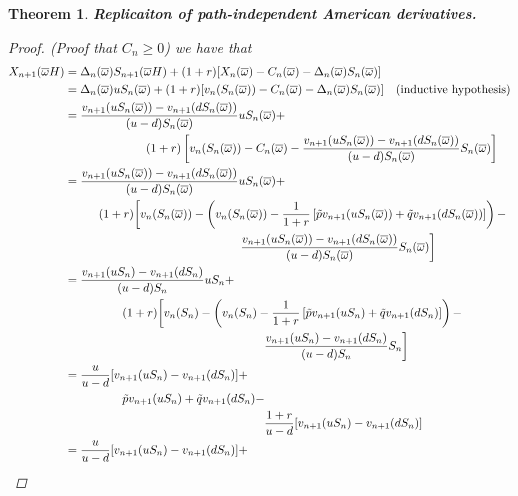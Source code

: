\documentclass[12pt]{article}
\newtheorem{theorem}{Theorem}
\begin{document}
\begin{theorem}{\bf Replicaiton of path-independent American derivatives.}
\begin{proof} {(\em Proof that $C_n \geq 0$)}
we have that
\begin{align*}
	X_{n + 1}(\overline{\omega} H) &= \Delta_n(\overline{\omega})S_{n + 1}(\overline{\omega}H) + (1 + r)[X_n(\overline{\omega}) - C_n(\overline{\omega}) - \Delta_n(\overline{\omega})S_n(\overline{\omega})] \\
	&= \Delta_n(\overline{\omega})uS_n(\overline{\omega}) + (1 + r)[ v_n(S_n(\overline{\omega})) - C_n(\overline{\omega}) - \Delta_n(\overline{\omega})S_n(\overline{\omega})] \quad \text{(inductive hypothesis)} \\
	&= \frac{v_{n + 1}(uS_n(\overline{\omega})) - v_{n + 1}(dS_n(\overline{\omega}))}{(u - d)S_n(\overline{\omega})} uS_n(\overline{\omega}) + \\
	&\hphantom{{}={------}} (1 + r) \left[v_n(S_n(\overline{\omega})) - C_n(\overline{\omega}) - \frac{v_{n + 1}(uS_n(\overline{\omega})) - v_{n + 1}(dS_n(\overline{\omega}))}{(u - d)S_n(\overline{\omega})} S_n(\overline{\omega}) \right] \\
	&= \frac{v_{n + 1}(uS_n(\overline{\omega})) - v_{n + 1}(dS_n(\overline{\omega}))}{(u - d)S_n(\overline{\omega})} uS_n(\overline{\omega}) + \\
	&\hphantom{{}={--}} (1 + r) \bigg[v_n(S_n(\overline{\omega})) - \left( v_n(S_n(\overline{\omega})) - \frac{1}{1 + r}\left[\tilde{p}v_{n + 1}(uS_n(\overline{\omega})) + \tilde{q}v_{n + 1}(dS_n(\overline{\omega}) )\right] \right) - \\
	&\hphantom{{}={--------------}} \frac{v_{n + 1}(uS_n(\overline{\omega})) - v_{n + 1}(dS_n(\overline{\omega}))}{(u - d)S_n(\overline{\omega})} S_n(\overline{\omega}) \bigg] \\
	&= \frac{v_{n + 1}(uS_n) - v_{n + 1}(dS_n)}{(u - d)S_n} uS_n + \\
	&\hphantom{{}={----}} (1 + r) \bigg[v_n(S_n) - \left( v_n(S_n) - \frac{1}{1 + r}\left[\tilde{p}v_{n + 1}(uS_n) + \tilde{q}v_{n + 1}(dS_n)\right] \right) - \\
	&\hphantom{{}={----------------}} \frac{v_{n + 1}(uS_n) - v_{n + 1}(dS_n)}{(u - d)S_n} S_n \bigg] \\	
	&= \frac{u}{u - d}[v_{n + 1}(uS_n) - v_{n + 1}(dS_n)] + \\
	&\hphantom{{}={----}} \tilde{p}v_{n + 1}(uS_n) + \tilde{q}v_{n + 1}(dS_n) - \\
	&\hphantom{{}={----------------}} \frac{1 + r}{u - d} [ v_{n + 1}(uS_n) - v_{n + 1}(dS_n)]  \\
	&= \frac{u}{u - d}[v_{n + 1}(uS_n) - v_{n + 1}(dS_n)] + \\

\end{align*}
\end{proof}
\end{theorem}
\end{document}
